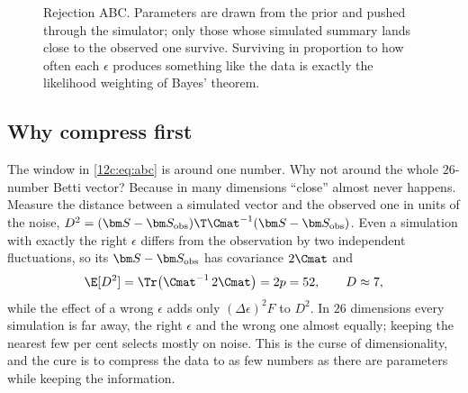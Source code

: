 \begin{figure}[htbp]
\centering
{}
\caption{Rejection ABC. Parameters are drawn from the prior and pushed through the simulator; only those whose simulated summary
lands close to the observed one survive. Surviving in proportion to how often each $\epsilon$ produces something like the data
is exactly the likelihood weighting of Bayes' theorem.}
\label{12c:fig:abcloop}
\end{figure}

\subsection{Why compress first}
\label{12c:sec:compress}

The window in \eqref{12c:eq:abc} is around one number. Why not around the whole $26$-number Betti vector? Because in many
dimensions ``close'' almost never happens. Measure the distance between a simulated vector and the observed one in units of the
noise, $D^2=(\bm S-\bm S_{\rm obs})\T\Cmat^{-1}(\bm S-\bm S_{\rm obs})$. Even a simulation with exactly the right $\epsilon$ differs from
the observation by two independent fluctuations, so its $\bm S-\bm S_{\rm obs}$ has covariance $2\Cmat$ and
\begin{equation}
  \E[D^2]=\Tr\bigl(\Cmat^{-1}\,2\Cmat\bigr)=2p=52,\qquad D\approx7 ,
  \label{12c:eq:curse}
\end{equation}
while the effect of a wrong $\epsilon$ adds only $(\Delta\epsilon)^2F$ to $D^2$. In $26$ dimensions every simulation is far away, the
right $\epsilon$ and the wrong one almost equally; keeping the nearest few per cent selects mostly on noise. This is the curse of
dimensionality, and the cure is to compress the data to as few numbers as there are parameters while keeping the information.


